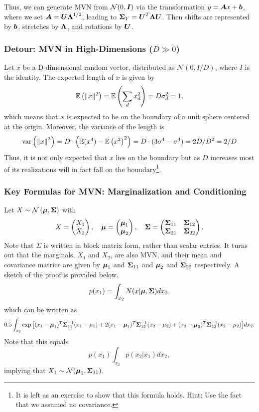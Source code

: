 \documentclass{article}
\begin{document}
Thus, we can generate MVN from $\mathcal{N}(0,\boldsymbol{I})$ via the transformation $y = \boldsymbol{A} x + \boldsymbol{b}$, where we set $\boldsymbol{A} = \boldsymbol{U} \boldsymbol{\Lambda}^{1/2}$, leading to $\boldsymbol{\Sigma}_Y = \boldsymbol{U}^T \boldsymbol{\Lambda} \boldsymbol{U}$. Then shifts are represented by $\boldsymbol{b}$, stretches by $\boldsymbol{\Lambda}$, and rotations by $\boldsymbol{U}$.

\subsubsection{Detour: MVN in High-Dimensions ($D\gg 0$)}
Let $x$ be a D-dimensional random vector, distributed as $\mathcal{N}(0,I/D)$, where $I$ is the identity. The expected length of $x$ is given by
$$ \mathbb{E}\left(\lVert x \rVert^2\right) = \mathbb{E}\left(\sum_d{x_d^2}\right) = D\sigma_d^2 = 1, $$
which means that $x$ is expected to be on the boundary of a unit sphere centered at the origin. Moreover, the variance of the length is
$$ \text{var}\left({\lVert x \rVert}^2 \right) = D\cdot\left(\mathbb{E}(x^4) - \mathbb{E}\left(x^2\right)^2\right) = D\cdot(3\sigma^4-\sigma^4) = 2D/D^2 = 2/D$$
Thus, it is not only expected that $x$ lies on the boundary but as $D$ increases most of its realizations will in fact fall on the boundary\footnote{It is left as an exercise to show that this formula holds.  Hint: Use the fact that we assumed no covariance.}.

\subsubsection{Key Formulas for MVN: Marginalization and Conditioning}
Let $X \sim \mathcal{N}\left(\boldsymbol{\mu},\boldsymbol{\Sigma}\right)$ with
$$ X = \begin{pmatrix}X_1\\X_2\end{pmatrix}, \quad 
\boldsymbol{\mu} = \begin{pmatrix}\boldsymbol{\mu}_1\\ \boldsymbol{\mu}_2\end{pmatrix}, \quad
\boldsymbol{\Sigma} = \begin{pmatrix}
\boldsymbol{\Sigma}_{11} & \boldsymbol{\Sigma}_{12} \\
\boldsymbol{\Sigma}_{21} & \boldsymbol{\Sigma}_{22}
\end{pmatrix}.
$$
Note that $\Sigma$ is written in block matrix form, rather than scalar entries.  It turns out that the marginals, $X_1$ and $X_2$, are also MVN, and their mean and covariance matrice are given by $\boldsymbol{\mu}_1$ and $\boldsymbol{\Sigma}_{11}$ and $\boldsymbol{\mu}_2$ and $\boldsymbol{\Sigma}_{22}$ respectively. A sketch of the proof is provided below.
$$ p(x_1) = \int_{x_2}{N(x|\boldsymbol{\mu},\boldsymbol{\Sigma})dx_2}, $$
which can be written as
$$ 0.5\int_{x_2}{\exp{\left[(x_1-\boldsymbol{\mu}_1)^T\boldsymbol{\Sigma}_{11}^{-1}(x_1-\mu_1) 
+ 2(x_1-\boldsymbol{\mu}_1)^T\boldsymbol{\Sigma}_{12}^{-1}(x_2-\mu_2) + 
(x_2-\boldsymbol{\mu}_2)^T\boldsymbol{\Sigma}_{22}^{-1}(x_2-\mu_2)\right]}dx_2}. $$
Note that this equals
$$ p(x_1)\int_{x_2}{p(x_2|x_1)dx_2}, $$
implying that $X_1\sim\mathcal{N}(\boldsymbol{\mu}_1,\boldsymbol{\Sigma}_{11})$. 
\end{document}
